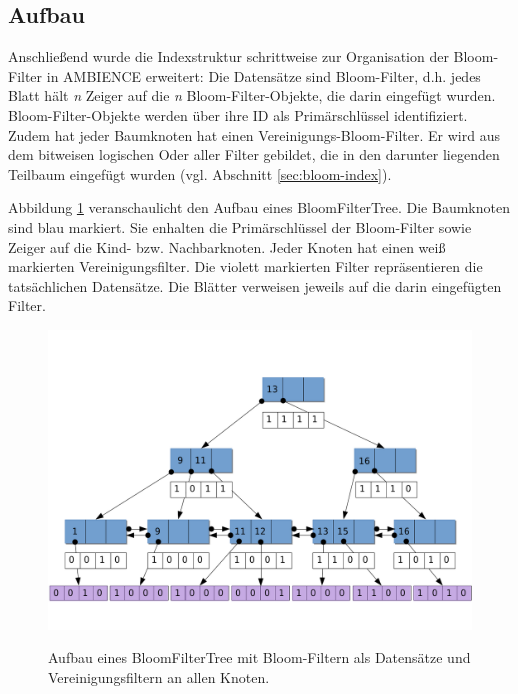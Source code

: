 \subsection{Aufbau}\label{sec:aufbau} 
Anschließend wurde die Indexstruktur schrittweise zur Organisation der Bloom-Filter in AMBIENCE erweitert: Die Datensätze sind Bloom-Filter, d.h. jedes Blatt hält \textit{n} Zeiger auf die \textit{n} Bloom-Filter-Objekte, die darin eingefügt wurden. Bloom-Filter-Objekte werden über ihre ID als Primärschlüssel identifiziert. Zudem hat jeder Baumknoten hat einen Vereinigungs-Bloom-Filter. Er wird aus dem bitweisen logischen Oder aller Filter gebildet, die in den darunter liegenden Teilbaum eingefügt wurden (vgl. Abschnitt \ref{sec:bloom-index}).

Abbildung \ref{fig:bloomfiltertree} veranschaulicht den Aufbau eines BloomFilterTree. Die Baumknoten sind blau markiert. Sie enhalten die Primärschlüssel der Bloom-Filter sowie Zeiger auf die Kind- bzw. Nachbarknoten. Jeder Knoten hat einen weiß markierten Vereinigungsfilter. Die violett markierten Filter repräsentieren die tatsächlichen Datensätze. Die Blätter verweisen jeweils auf die darin eingefügten Filter.
\begin{figure}[hpbt]
  \centering
  \includegraphics[width=1.0\textwidth]{pictures/bloom-filter-tree2.png}\\
  \caption[Aufbau eines BloomFilterTree]{Aufbau eines BloomFilterTree mit Bloom-Filtern als Datensätze und Vereinigungsfiltern an allen Knoten.}\label{fig:bloomfiltertree}
\end{figure}

